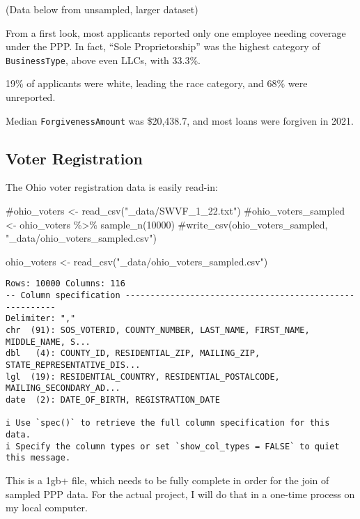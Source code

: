 \documentclass[
  letterpaper,
  DIV=11,
  numbers=noendperiod]{scrartcl}
\newenvironment{Shaded}{\begin{snugshade}}{\end{snugshade}}
\newcommand{\CommentTok}[1]{\textcolor[rgb]{0.37,0.37,0.37}{#1}}
\newcommand{\FunctionTok}[1]{\textcolor[rgb]{0.28,0.35,0.67}{#1}}
\newcommand{\NormalTok}[1]{\textcolor[rgb]{0.00,0.23,0.31}{#1}}
\newcommand{\OtherTok}[1]{\textcolor[rgb]{0.00,0.23,0.31}{#1}}
\newcommand{\StringTok}[1]{\textcolor[rgb]{0.13,0.47,0.30}{#1}}
\begin{document}
(Data below from unsampled, larger dataset)

From a first look, most applicants reported only one employee needing
coverage under the PPP. In fact, ``Sole Proprietorship'' was the highest
category of \texttt{BusinessType}, above even LLCs, with 33.3\%.

19\% of applicants were white, leading the race category, and 68\% were
unreported.

Median \texttt{ForgivenessAmount} was \$20,438.7, and most loans were
forgiven in 2021.

\hypertarget{voter-registration}{%
\subsection{Voter Registration}\label{voter-registration}}

The Ohio voter registration data is easily read-in:

\begin{Shaded}
\begin{Highlighting}[]
\CommentTok{\#ohio\_voters \textless{}{-} read\_csv("\_data/SWVF\_1\_22.txt")}
\CommentTok{\#ohio\_voters\_sampled \textless{}{-} ohio\_voters \%\textgreater{}\% sample\_n(10000)}
\CommentTok{\#write\_csv(ohio\_voters\_sampled, "\_data/ohio\_voters\_sampled.csv")}

\NormalTok{ohio\_voters }\OtherTok{\textless{}{-}} \FunctionTok{read\_csv}\NormalTok{(}\StringTok{"\_data/ohio\_voters\_sampled.csv"}\NormalTok{)}
\end{Highlighting}
\end{Shaded}

\begin{verbatim}
Rows: 10000 Columns: 116
-- Column specification --------------------------------------------------------
Delimiter: ","
chr  (91): SOS_VOTERID, COUNTY_NUMBER, LAST_NAME, FIRST_NAME, MIDDLE_NAME, S...
dbl   (4): COUNTY_ID, RESIDENTIAL_ZIP, MAILING_ZIP, STATE_REPRESENTATIVE_DIS...
lgl  (19): RESIDENTIAL_COUNTRY, RESIDENTIAL_POSTALCODE, MAILING_SECONDARY_AD...
date  (2): DATE_OF_BIRTH, REGISTRATION_DATE

i Use `spec()` to retrieve the full column specification for this data.
i Specify the column types or set `show_col_types = FALSE` to quiet this message.
\end{verbatim}

This is a 1gb+ file, which needs to be fully complete in order for the
join of sampled PPP data. For the actual project, I will do that in a
one-time process on my local computer.
\end{document}

